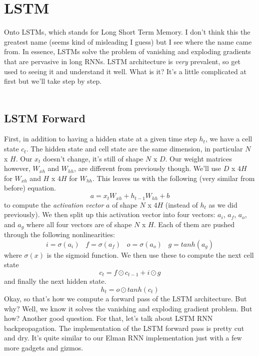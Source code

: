 \documentclass[12pt]{article}
\begin{document}
\section{LSTM}
Onto LSTMs, which stands for Long Short Term Memory. I don't think this the greatest name 
(seems kind of misleading I guess) but I see where the name came from. In essence, LSTMs 
solve the problem of vanishing and exploding gradients that are pervasive in long 
RNNs. LSTM architecture is \emph{very} prevalent, so get used to seeing it and understand 
it well. What is it? It's a little complicated at first but we'll take step by step. 
~\\
~\\
\subsection{LSTM Forward}
First, in addition to having a hidden state at a given time step $h_t$, we have a cell state 
$c_t$. The hidden state and cell state are the same dimension, in particular $N$ x $H$. Our $x_t$ 
doesn't change, it's still of shape $N$ x $D$. Our weight matrices however, $W_{xh}$ and $W_{hh}$,
are different from previously though. We'll use $D$ x $4H$ for $W_{xh}$ and $H$ x $4H$ for $W_{hh}$. 
This leaves us with the following (very similar from before) equation. 
\begin{equation*}
    a = x_t W_{xh} + h_{t-1} W_{hh}  + b
\end{equation*}
to compute the \emph{activation vector} $a$ of shape $N$ x $4H$ (instead of $h_t$ as we did previously). 
We then split up this activation 
vector into four vectors: $a_i$, $a_f$, $a_o$, and $a_g$ where all four vectors are of shape 
$N$ x $H$. Each of them are pushed through the following nonlinearities: 
\begin{equation*}
    i = \sigma(a_i) \; \; \; f = \sigma(a_f) \; \; \; o = \sigma(a_o) \; \; \; g = tanh(a_g)
\end{equation*}
where $\sigma(x)$ is the sigmoid function. We then use these to compute the next cell state
\begin{equation*}
    c_t = f \odot c_{t-1} + i \odot g 
\end{equation*}
and finally the next hidden state. 
\begin{equation*}
    h_t = o \odot tanh(c_t)
\end{equation*}
Okay, so that's how we compute a forward pass of the LSTM architecture. But why? Well, we 
know it solves the vanishing and exploding gradient problem. But how? Another good question. 
For that, let's talk about LSTM RNN backpropagation. The implementation of the LSTM 
forward pass is pretty cut and dry. It's quite similar to our Elman RNN implementation 
just with a few more gadgets and gizmos. 
\end{document}
